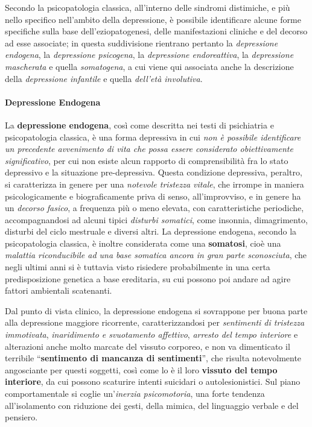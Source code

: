 Secondo la psicopatologia classica, all'interno delle sindromi
distimiche, e più nello specifico nell'ambito della depressione, è
possibile identificare alcune forme specifiche sulla base
dell'eziopatogenesi, delle manifestazioni cliniche e del decorso ad esse
associate; in questa suddivisione rientrano pertanto la
\emph{depressione endogena}, la \emph{depressione psicogena}, la
\emph{depressione endoreattiva}, la \emph{depressione mascherata} e
quella \emph{somatogena}, a cui viene qui associata anche la descrizione
della \emph{depressione infantile} e quella \emph{dell'età involutiva}.

\paragraph{Depressione Endogena}

La \textbf{depressione endogena}, così come descritta nei testi di
psichiatria e psicopatologia classica, è una forma depressiva in cui
\emph{non è possibile identificare un precedente avvenimento di vita che
possa essere considerato obiettivamente significativo}, per cui non
esiste alcun rapporto di comprensibilità fra lo stato depressivo e la
situazione pre-depressiva. Questa condizione depressiva, peraltro, si
caratterizza in genere per una \emph{notevole tristezza vitale}, che
irrompe in maniera psicologicamente e biograficamente priva di senso,
all'improvviso, e in genere ha un \emph{decorso fasico}, a frequenza più
o meno elevata, con caratteristiche periodiche, accompagnandosi ad
alcuni tipici \emph{disturbi somatici}, come insonnia, dimagrimento,
disturbi del ciclo mestruale e diversi altri. La depressione endogena,
secondo la psicopatologia classica, è inoltre considerata come una
\textbf{somatosi}, cioè una \emph{malattia riconducibile ad una base
somatica ancora in gran parte sconosciuta}, che negli ultimi anni si è
tuttavia visto risiedere probabilmente in una certa predisposizione
genetica a base ereditaria, su cui possono poi andare ad agire fattori
ambientali scatenanti.

Dal punto di vista clinico, la depressione endogena si sovrappone per
buona parte alla depressione maggiore ricorrente, caratterizzandosi per
\emph{sentimenti di tristezza immotivata}, \emph{inaridimento e
svuotamento affettivo}, \emph{arresto del tempo interiore} e alterazioni
anche molto marcate del vissuto corporeo, e non va dimenticato il
terribile ``\textbf{sentimento di mancanza di sentimenti}'', che risulta
notevolmente angosciante per questi soggetti, così come lo è il loro
\textbf{vissuto del tempo interiore}, da cui possono scaturire intenti
suicidari o autolesionistici. Sul piano comportamentale si coglie
un'\emph{inerzia psicomotoria}, una forte tendenza all'isolamento con
riduzione dei gesti, della mimica, del linguaggio verbale e del
pensiero.

